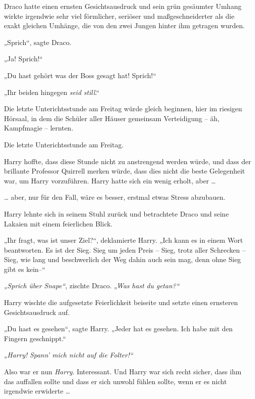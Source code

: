 

\hypertarget{belohnungsaufschub}{%

Draco hatte einen ernsten Gesichtsausdruck und sein grün gesäumter Umhang wirkte irgendwie sehr viel förmlicher, seriöser und maßgeschneiderter als die exakt gleichen Umhänge, die von den zwei Jungen hinter ihm getragen wurden.

„Sprich“, sagte Draco.

„Ja! Sprich!“

„Du hast gehört was der Boss gesagt hat! Sprich!“

„Ihr beiden hingegen \emph{seid still}.“

Die letzte Unterichtsstunde am Freitag würde gleich beginnen, hier im riesigen Hörsaal, in dem die Schüler aller Häuser gemeinsam Verteidigung -- äh, Kampfmagie -- lernten.

Die letzte Unterichtsstunde am Freitag.

Harry hoffte, dass diese Stunde nicht zu anstrengend werden würde, und dass der brillante Professor Quirrell merken würde, dass dies nicht die beste Gelegenheit war, um Harry vorzuführen. Harry hatte sich ein wenig erholt, aber …

… aber, nur für den Fall, wäre es besser, erstmal etwas Stress abzubauen.

Harry lehnte sich in seinem Stuhl zurück und betrachtete Draco und seine Lakaien mit einem feierlichen Blick.

„Ihr fragt, was ist unser Ziel?“, deklamierte Harry. „Ich kann es in einem Wort beantworten. Es ist der Sieg. Sieg um jeden Preis -- Sieg, trotz aller Schrecken -- Sieg, wie lang und beschwerlich der Weg dahin auch sein mag, denn ohne Sieg gibt es kein--“

\emph{„Sprich über Snape“}, zischte Draco. \emph{„Was hast du getan?“}

Harry wischte die aufgesetzte Feierlichkeit beiseite und setzte einen ernsteren Gesichtsausdruck auf.

„Du hast es gesehen“, sagte Harry. „Jeder hat es gesehen. Ich habe mit den Fingern geschnippt.“

\emph{„Harry! Spann' mich nicht auf die Folter!“}

Also war er nun \emph{Harry}. Interessant. Und Harry war sich recht sicher, dass ihm das auffallen sollte und dass er sich unwohl fühlen sollte, wenn er es nicht irgendwie erwiderte …

}
